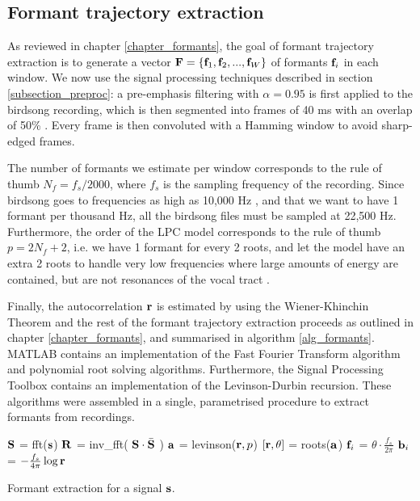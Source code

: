 \documentclass[../main.tex]{subfiles}
\begin{document}
\subsection{Formant trajectory extraction} \label{section_impformants}
As reviewed in chapter \ref{chapter_formants}, the goal of formant trajectory extraction is to generate a vector $\mathbf{F} = \{\mathbf{f}_1, \mathbf{f}_2, ..., \mathbf{f}_W\}$ of formants $\mathbf{f}_i$ in each window. We now use the signal processing techniques described in section \ref{subsection_preproc}: a pre-emphasis filtering with $\alpha = 0.95$ is first applied to the birdsong recording, which is then segmented into frames of 40 ms with an overlap of 50\% \cite{Stowell2014}. Every frame is then convoluted with a Hamming window to avoid sharp-edged frames. 
\par The number of formants we estimate per window corresponds to the rule of thumb $N_f = f_s / 2000$, where $f_s$ is the sampling frequency of the recording. Since birdsong goes to frequencies as high as 10,000 Hz \cite{Marler2004}, and that we want to have 1 formant per thousand Hz, all the birdsong files must be sampled at 22,500 Hz. Furthermore, the order of the LPC model corresponds to the rule of thumb $p = 2N_f + 2$, i.e. we have 1 formant for every 2 roots, and let the model have an extra 2 roots to handle very low frequencies where large amounts of energy are contained, but are not resonances of the vocal tract \cite{Benesty}. 
\par Finally, the autocorrelation $\mathbf{r}$ is estimated by using the Wiener-Khinchin Theorem and the rest of the formant trajectory extraction proceeds as outlined in chapter \ref{chapter_formants}, and summarised in algorithm \ref{alg_formants}. MATLAB contains an implementation of the Fast Fourier Transform algorithm and polynomial root solving algorithms. Furthermore, the Signal Processing Toolbox contains an implementation of the Levinson-Durbin recursion. These algorithms were assembled in a single, parametrised procedure to extract formants from recordings.

\begin{algorithm}
\begin{algorithmic}[1]
\State $\mathbf{S}$ = fft($\mathbf{s}$)
\State $\mathbf{R}$ = inv\_fft( $\mathbf{S} \cdot \bar{\mathbf{S}}$ )
\State $\mathbf{a}$ = levinson($\mathbf{r}, p$)
\State $\left[\mathbf{r}, \theta\right]$ = roots($\mathbf{a}$)
\State $\mathbf{f}_i$ = $\theta \cdot \frac{f_s}{2\pi}$
\State $\mathbf{b}_i$ = $-\frac{f_s}{4\pi}\log{\mathbf{r}}$
\EndFunction
\caption{Formant extraction for a signal $\mathbf{s}$.}\label{alg_formants}
\end{algorithmic}
\end{algorithm}
\end{document}
